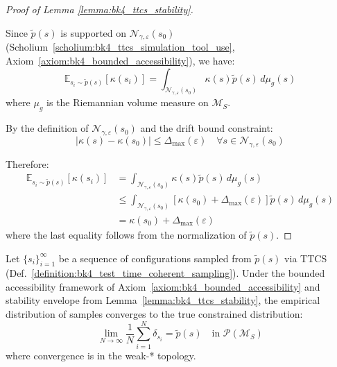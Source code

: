 \begin{proof}[Proof of Lemma \ref{lemma:bk4_ttcs_stability}]
\label{proof:bk4_ttcs_stability}
\leavevmode

Since $\tilde{p}(s)$ is supported on $\mathcal{N}_{\gamma,\varepsilon}(s_0)$ (Scholium~\ref{scholium:bk4_ttcs_simulation_tool_use}, Axiom~\ref{axiom:bk4_bounded_accessibility}), we have:
\[
\mathbb{E}_{s_i \sim \tilde{p}(s)} [\kappa(s_i)] = \int_{\mathcal{N}_{\gamma,\varepsilon}(s_0)} \kappa(s) \tilde{p}(s) \, d\mu_g(s)
\]
where $\mu_g$ is the Riemannian volume measure on $\mathcal{M}_S$.

By the definition of $\mathcal{N}_{\gamma,\varepsilon}(s_0)$ and the drift bound constraint:
\[
|\kappa(s) - \kappa(s_0)| \leq \Delta_{\max}(\varepsilon) \quad \forall s \in \mathcal{N}_{\gamma,\varepsilon}(s_0)
\]

Therefore:
\begin{align}
\mathbb{E}_{s_i \sim \tilde{p}(s)} [\kappa(s_i)] &= \int_{\mathcal{N}_{\gamma,\varepsilon}(s_0)} \kappa(s) \tilde{p}(s) \, d\mu_g(s) \\
&\leq \int_{\mathcal{N}_{\gamma,\varepsilon}(s_0)} [\kappa(s_0) + \Delta_{\max}(\varepsilon)] \tilde{p}(s) \, d\mu_g(s) \\
&= \kappa(s_0) + \Delta_{\max}(\varepsilon)
\end{align}
where the last equality follows from the normalization of $\tilde{p}(s)$.
\end{proof}

\begin{theorem}
\label{theorem:bk4_ttcs_convergence}
Let $\{s_i\}_{i=1}^{\infty}$ be a sequence of configurations sampled from $\tilde{p}(s)$ via TTCS (Def.~\ref{definition:bk4_test_time_coherent_sampling}). Under the bounded accessibility framework of Axiom~\ref{axiom:bk4_bounded_accessibility} and stability envelope from Lemma~\ref{lemma:bk4_ttcs_stability}, the empirical distribution of samples converges to the true constrained distribution:
\[
\lim_{N \to \infty} \frac{1}{N} \sum_{i=1}^N \delta_{s_i} = \tilde{p}(s) \quad \text{in } \mathcal{P}(\mathcal{M}_S)
\]
where convergence is in the weak-* topology.
\end{theorem}

